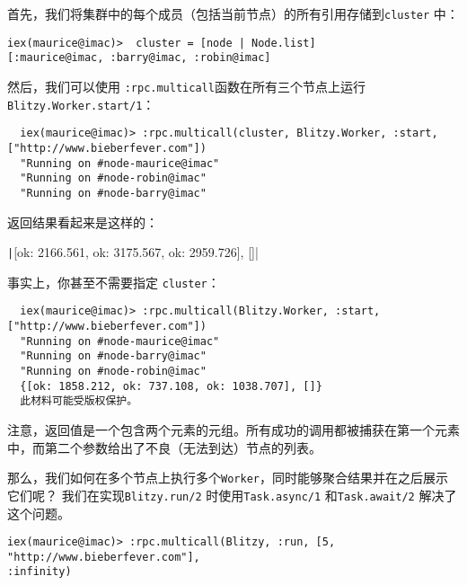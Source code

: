 首先，我们将集群中的每个成员（包括当前节点）的所有引用存储到\texttt{cluster} 中：

\begin{code}{}
\begin{verbatim}
iex(maurice@imac)>  cluster = [node | Node.list]
[:maurice@imac, :barry@imac, :robin@imac]
\end{verbatim}
\end{code}

然后，我们可以使用 \texttt{:rpc.multicall}函数在所有三个节点上运行\texttt{Blitzy.Worker.start/1}：

\begin{code}{}
\begin{verbatim}
  iex(maurice@imac)> :rpc.multicall(cluster, Blitzy.Worker, :start, ["http://www.bieberfever.com"]) 
  "Running on #node-maurice@imac" 
  "Running on #node-robin@imac"
  "Running on #node-barry@imac"
\end{verbatim}
\end{code}

返回结果看起来是这样的：

\texttt|{[ok: 2166.561, ok: 3175.567, ok: 2959.726], []}|

事实上，你甚至不需要指定 \texttt{cluster}：

\begin{code}{}
\begin{verbatim}
  iex(maurice@imac)> :rpc.multicall(Blitzy.Worker, :start, ["http://www.bieberfever.com"]) 
  "Running on #node-maurice@imac" 
  "Running on #node-barry@imac" 
  "Running on #node-robin@imac"
  {[ok: 1858.212, ok: 737.108, ok: 1038.707], []}
  此材料可能受版权保护。
\end{verbatim}
\end{code}

注意，返回值是一个包含两个元素的元组。所有成功的调用都被捕获在第一个元素中，而第二个参数给出了不良（无法到达）节点的列表。

那么，我们如何在多个节点上执行多个\texttt{Worker}，同时能够聚合结果并在之后展示它们呢？
我们在实现\texttt{Blitzy.run/2} 时使用\texttt{Task.async/1} 和\texttt{Task.await/2} 解决了这个问题。

\begin{code}{}
\begin{verbatim}
iex(maurice@imac)> :rpc.multicall(Blitzy, :run, [5, "http://www.bieberfever.com"], 
:infinity)
\end{verbatim}
\end{code}

